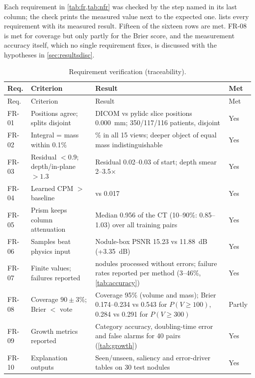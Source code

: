 Each requirement in \cref{tab:fr,tab:nfr} was checked by the step named in its last column; the check prints the measured value next to the expected one.  lists every requirement with its measured result. Fifteen of the sixteen rows are met. FR-08 is met for coverage but only partly for the Brier score, and the measurement accuracy itself, which no single requirement fixes, is discussed with the hypotheses in \cref{sec:resultsdisc}.


{\small
\begin{longtable}{>{\raggedright\arraybackslash}p{1.4cm} >{\raggedright\arraybackslash}p{4.3cm} >{\raggedright\arraybackslash}p{6.2cm} >{\raggedright\arraybackslash}p{1.3cm}}
\caption{Requirement verification (traceability).}\label{tab:verify}\\
\toprule
Req. & Criterion & Result & Met \\
\midrule
\endfirsthead
\toprule
Req. & Criterion & Result & Met \\
\midrule
\endhead
FR-01 & Positions agree; splits disjoint & DICOM vs pylidc slice positions 0.000~mm; 350/117/116 patients, disjoint & Yes \\
FR-02 & Integral = mass within 0.1\% & 0.03\% in all 15 views; deeper object of equal mass indistinguishable & Yes \\
FR-03 & Residual $<0.9$; depth/in-plane $>1.3$ & Residual 0.02--0.03 of start; depth smear 2--3.5$\times$ & Yes \\
FR-04 & Learned CPM $>$ baseline & 0.298 vs 0.017 & Yes \\
FR-05 & Prism keeps column attenuation & Median 0.956 of the CT (10--90\%: 0.85--1.03) over all training pairs & Yes \\
FR-06 & Samples beat physics input & Nodule-box PSNR 15.23 vs 11.88~dB (+3.35~dB) & Yes \\
FR-07 & Finite values; failures reported & 150 nodules processed without errors; failure rates reported per method (3--46\%, \cref{tab:accuracy}) & Yes \\
FR-08 & Coverage $90\pm3\%$; Brier $<$ vote & Coverage 95\% (volume and mass); Brier 0.174--0.234 vs 0.543 for $P(V\geq100)$, 0.284 vs 0.291 for $P(V\geq300)$ & Partly \\
FR-09 & Growth metrics reported & Category accuracy, doubling-time error and false alarms for 40 pairs (\cref{tab:growth}) & Yes \\
FR-10 & Explanation outputs & Seen/unseen, saliency and error-driver tables on 30 test nodules & Yes \\

\end{longtable}}
